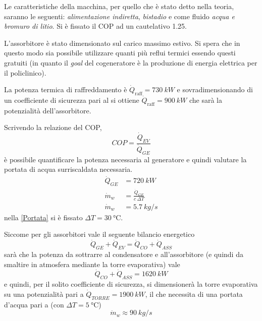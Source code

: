 Le caratteristiche della macchina, per quello che è stato detto nella teoria, saranno le seguenti: \emph{alimentazione indiretta}, \emph{bistadio} e come fluido \emph{acqua e bromuro di litio}. Si è fissato il COP ad un cautelativo \num{1.25}. 

L'assorbitore è stato dimensionato sul carico massimo estivo. Si spera che in questo modo sia possibile utilizzare quanti più reflui termici essendo questi gratuiti (in quanto il \emph{goal} del cogeneratore è la produzione di energia elettrica per il policlinico).

La potenza termica di raffreddamento è $\dot{Q}_{\mathrm{raff}}=\SI{730}{kW}$ e sovradimensionando di un coefficiente di sicurezza pari al  si ottiene $\dot{Q}_{\mathrm{raff}}=\SI{900}{kW}$ che sarà la potenzialità dell'assorbitore.

Scrivendo la relazione del COP,
\begin{equation}
	COP=\frac{\dot{Q}_{EV}}{\dot{Q}_{GE}}
\end{equation}
è possibile quantificare la potenza necessaria al generatore e quindi valutare la portata di acqua surriscaldata necessaria. 
\begin{align}
	\dot{Q}_{GE} &= \SI{720}{kW}\\
	\dot{m}_w &= \frac{\dot{Q}_{GE}}{c\ \mathit{\Delta} T}\label{Portata}\\
	\dot{m}_w&=\SI{5.7}{kg/s}\label{Portata:acquacalda}
\end{align}
nella \vref{Portata} si è fissato $\mathit{\Delta} T=\SI{30}{\degreeCelsius}$.

Siccome per gli assorbitori vale il seguente bilancio energetico
\begin{equation}
	\dot{Q}_{GE}+\dot{Q}_{EV}=\dot{Q}_{CO}+\dot{Q}_{ASS}
\end{equation}
sarà che la potenza da sottrarre al condensatore e all'assorbitore (e quindi da smaltire in atmosfera mediante la torre evaporativa) vale
\begin{equation}
	\dot{Q}_{CO}+\dot{Q}_{ASS}=\SI{1620}{kW}
\end{equation}
e quindi, per il solito coefficiente di sicurezza, si dimensionerà la torre evaporativa su una potenzialità pari a $\dot{Q}_{TORRE}=\SI{1900}{kW}$, il che necessita di una portata d'acqua pari a (con $\Delta T=\SI{5}{\degreeCelsius}$)
\begin{equation}
	\dot{m}_w\approx \SI{90}{kg/s}
\end{equation}


